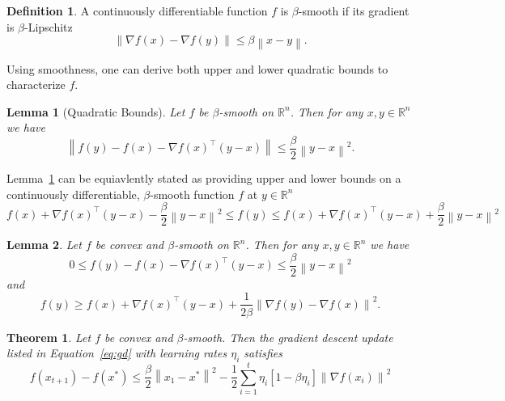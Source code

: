 \documentclass{article}
\newcommand{\R}{\mathbb R}
\newcommand{\norm}[1]{\left\| #1 \right\| }
\newtheorem{lemma}{Lemma}
\newtheorem{theorem}{Theorem}
\theoremstyle{definition}
\newtheorem{definition}{Definition}
\begin{document}
\begin{definition}
    A continuously differentiable function $f$ is $\beta$-smooth if its gradient
    is $\beta$-Lipschitz
    \begin{equation}
        \norm{\nabla f(x) - \nabla f(y)} \leq \beta \norm{x - y}.
    \end{equation}
\end{definition}

Using smoothness, one can derive both upper and lower quadratic bounds to
characterize $f$. 

\begin{lemma}[Quadratic Bounds]
    \label{lem:quadratic_bounds}
    Let $f$ be $\beta$-smooth on $\R^n$. Then for any $x, y \in \R^n$ we have 
    \begin{equation}
        \norm{f(y) - f(x) - \nabla {f(x)}^\intercal(y - x)} \leq \frac{\beta}{2}
        \norm{y - x}^2.
    \end{equation}
\end{lemma}

Lemma~\ref{lem:quadratic_bounds} can be equiavlently stated as providing upper
and lower bounds on a continuously differentiable, $\beta$-smooth function $f$
at $y \in \R^n$
\begin{equation}
    f(x) + \nabla {f(x)}^\intercal(y - x) - \frac{\beta}{2} \norm{y - x}^2 \leq
    f(y) \leq
    f(x) + \nabla {f(x)}^\intercal(y - x) + \frac{\beta}{2} \norm{y - x}^2
\end{equation}

\begin{lemma}
    \label{lem:con_smo}
    Let $f$ be convex and $\beta$-smooth on $\R^n$. Then for any $x, y \in \R^n$ we have
    \begin{equation}
        \label{eq:lem4_1}
        0 \leq f(y) - f(x) - \nabla {f(x)}^\intercal (y - x) \leq
        \frac{\beta}{2} \norm{y - x}^2
    \end{equation}
    and
    \begin{equation}
        \label{eq:lem4_2}
        f(y) \geq f(x) + \nabla {f(x)}^\intercal (y - x) + \frac{1}{2\beta}
        \norm{\nabla f(y) - \nabla f(x)}^2.
    \end{equation}
\end{lemma}

\begin{theorem}
    Let $f$ be convex and $\beta$-smooth. Then the
    gradient descent update listed in Equation~\ref{eq:gd} with learning rates
    $\eta_i$ satisfies
    \begin{equation}
        f(x_{t+1}) - f(x^*) \leq \frac{\beta}{2}\norm{x_1 - x^*}^2 - \frac 1 2\sum_{i =
        1}^{t}  \eta_i\left[1 - \beta\eta_i\right] \norm{\nabla f(x_i)}^2
    \end{equation}
\end{theorem}
\end{document}
